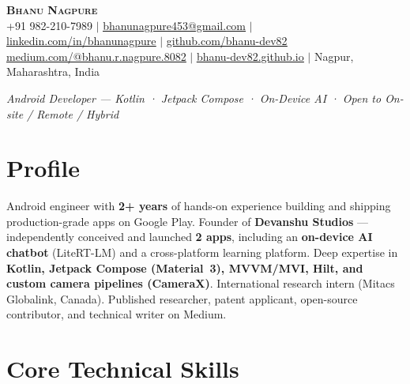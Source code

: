 \documentclass[letterpaper,11pt]{article}
\begin{document}
\begin{center}
    {\Huge\bfseries\scshape Bhanu Nagpure} \\[5pt]
    \small
    +91 982-210-7989 \;$|$\;
    \href{mailto:bhanunagpure453@gmail.com}{\underline{bhanunagpure453@gmail.com}} \;$|$\;
    \href{https://www.linkedin.com/in/bhanunagpure/}{\underline{linkedin.com/in/bhanunagpure}} \;$|$\;
    \href{https://github.com/bhanu-dev82}{\underline{github.com/bhanu-dev82}}
    \\[2pt]
    \href{https://medium.com/@bhanu.r.nagpure.8082}{\underline{medium.com/@bhanu.r.nagpure.8082}} \;$|$\;
    \href{https://bhanu-dev82.github.io}{\underline{bhanu-dev82.github.io}} \;$|$\;
    Nagpur, Maharashtra, India
\end{center}

\vspace{2pt}
\begin{center}
  \small\textit{Android Developer — Kotlin · Jetpack Compose · On-Device AI · Open to On-site / Remote / Hybrid}
\end{center}

\vspace{4pt}

\section{Profile}

\small{Android engineer with \textbf{2+ years} of hands-on experience building and shipping production-grade apps on Google Play. Founder of \textbf{Devanshu Studios} — independently conceived and launched \textbf{2 apps}, including an \textbf{on-device AI chatbot} (LiteRT-LM) and a cross-platform learning platform. Deep expertise in \textbf{Kotlin, Jetpack Compose (Material~3), MVVM/MVI, Hilt, and custom camera pipelines (CameraX)}. International research intern (Mitacs Globalink, Canada). Published researcher, patent applicant, open-source contributor, and technical writer on Medium.}

\section{Core Technical Skills}
\end{document}
